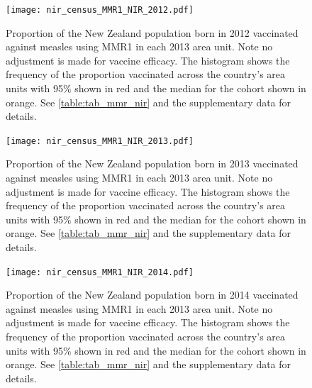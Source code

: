 \documentclass{article}
\begin{document}
\begin{figure}
\begin{center}
    \texttt{[image: nir\_census\_MMR1\_NIR\_2012.pdf]}
 \end{center}
    \caption{Proportion of the New Zealand population born in 2012 vaccinated against measles using MMR1 in each 2013 area unit. Note no adjustment is made for vaccine efficacy. The histogram shows the frequency of the proportion vaccinated across the country's area units with 95\% shown in red and the median for the cohort shown in orange. See \autoref{table:tab_mmr_nir} and the supplementary data for details.}
\label{fig:fig12012}
\end{figure}


\begin{figure}
\begin{center}
    \texttt{[image: nir\_census\_MMR1\_NIR\_2013.pdf]}
 \end{center}
    \caption{Proportion of the New Zealand population born in 2013 vaccinated against measles using MMR1 in each 2013 area unit. Note no adjustment is made for vaccine efficacy. The histogram shows the frequency of the proportion vaccinated across the country's area units with 95\% shown in red and the median for the cohort shown in orange. See \autoref{table:tab_mmr_nir} and the supplementary data for details.}
\label{fig:fig12013}
\end{figure}


\begin{figure}
\begin{center}
    \texttt{[image: nir\_census\_MMR1\_NIR\_2014.pdf]}
 \end{center}
    \caption{Proportion of the New Zealand population born in 2014 vaccinated against measles using MMR1 in each 2013 area unit. Note no adjustment is made for vaccine efficacy. The histogram shows the frequency of the proportion vaccinated across the country's area units with 95\% shown in red and the median for the cohort shown in orange. See \autoref{table:tab_mmr_nir} and the supplementary data for details.}
\label{fig:fig12014}
\end{figure}
\end{document}
